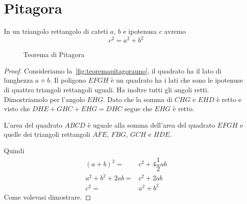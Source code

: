 \chapter{Pitagora}
\begin{thm}
In un triangolo rettangolo di cateti $a$, $b$ e ipotenusa $c$ avremo\[c^2=a^2+b^2\]
\end{thm}
\begin{figure}
	\centering
	
	\caption{Teorema di Pitagora}
	\label{fig:teoremapitagorauno}
\end{figure}
\begin{proof}
	Consideriamo la~\vref{fig:teoremapitagorauno}, il quadrato ha il lato di lunghezza $a+b$.  Il poligono $EFGH$ è un quadrato ha i lati che sono le ipotenuse di quattro triangoli rettangoli uguali. Ha inoltre tutti gli angoli retti. Dimostriamolo per l'angolo $EHG$. Dato che la somma di $CHG$ e $EHD$ è  retto e visto che $DHE+GHC+EHG=DHC$ segue che $EHG$ è retto.\par 
	L'area del quadrato $ABCD$ è uguale alla somma dell'area del quadrato $EFGH$ e quelle dei triangoli rettangoli $AFE$, $FBG$, $GCH$ e $HDE$.\par Quindi
	\begin{align*}
	(a+b)^2=&c^2+4\dfrac{1}{2}ab\\
	a^2+b^2+2ab=&c^2+2ab\\
	c^2=&a^2+b^2
	\end{align*}
	Come volevasi dimostrare.
\end{proof}